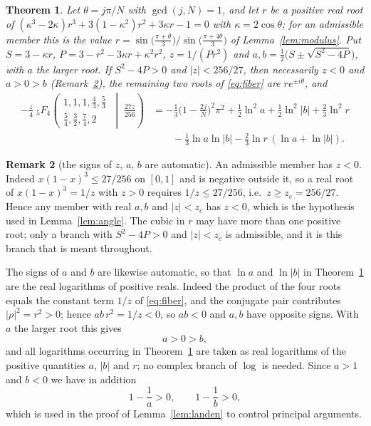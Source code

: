 \documentclass[11pt]{article}
\newtheorem{theorem}{Theorem}
\theoremstyle{definition}
\newtheorem{remark}[theorem]{Remark}
\begin{document}
\begin{theorem}\label{thm:main}
Let $\theta=j\pi/N$ with $\gcd(j,N)=1$, and let $r$ be a positive real root of
$(\kappa^3-2\kappa)r^3+3(1-\kappa^2)r^2+3\kappa r-1=0$ with $\kappa=2\cos\theta$; for an admissible
member this is the value $r=\sin\big(\tfrac{\pi+\theta}{3}\big)/\sin\big(\tfrac{\pi+4\theta}{3}\big)$
of Lemma~\textup{\ref{lem:modulus}}. Put
$S=3-\kappa r$, $P=3-r^2-3\kappa r+\kappa^2r^2$, $z=1/(Pr^2)$ and
$a,b=\tfrac12\big(S\pm\sqrt{S^2-4P}\big)$, with $a$ the larger root. If $S^2-4P>0$ and $|z|<256/27$,
then necessarily $z<0$ and $a>0>b$ (Remark~\textup{\ref{rem:signs}}), the remaining two roots of
\eqref{eq:fiber} are $re^{\pm i\theta}$, and
\begin{align*}
  -\frac{z}{4}\;{}_5F_4\!\left(\begin{matrix}1,1,1,\tfrac43,\tfrac53\\[2pt]
      \tfrac54,\tfrac32,\tfrac74,2\end{matrix}\;\middle|\;\frac{27z}{256}\right)
  &= -\frac13\Big(1-\frac{2j}{N}\Big)^2\pi^2
    + \tfrac12\ln^2 a+\tfrac12\ln^2|b|+\tfrac23\ln^2 r\\[2pt]
  &\qquad-\tfrac13\ln a\ln|b|-\tfrac23\ln r\,(\ln a+\ln|b|).
\end{align*}
\end{theorem}

\begin{remark}[the signs of $z$, $a$, $b$ are automatic]\label{rem:signs}
An admissible member has $z<0$. Indeed $x(1-x)^3\le 27/256$ on $[0,1]$ and is negative outside it, so
a real root of $x(1-x)^3=1/z$ with $z>0$ requires $1/z\le27/256$, i.e.\ $z\ge z_c=256/27$. Hence any
member with real $a,b$ and $|z|<z_c$ has $z<0$, which is the hypothesis used in Lemma~\ref{lem:angle}.
The cubic in $r$ may have more than one positive root; only a branch with $S^2-4P>0$ and $|z|<z_c$ is
admissible, and it is this branch that is meant throughout.

The signs of $a$ and $b$ are likewise automatic, so that $\ln a$ and $\ln|b|$ in
Theorem~\ref{thm:main} are the real logarithms of positive reals. Indeed the product of the four
roots equals the constant term $1/z$ of \eqref{eq:fiber}, and the conjugate pair contributes
$|\rho|^2=r^2>0$; hence $ab\,r^2=1/z<0$, so $ab<0$ and $a,b$ have opposite signs. With $a$ the larger
root this gives
\[
  a>0>b ,
\]
and all logarithms occurring in Theorem~\ref{thm:main} are taken as real logarithms of the positive
quantities $a$, $|b|$ and $r$; no complex branch of $\log$ is needed. Since $a>1$ and $b<0$ we have
in addition
\[
  1-\frac1a>0,\qquad 1-\frac1b>0,
\]
which is used in the proof of Lemma~\ref{lem:landen} to control principal arguments.
\end{remark}
\end{document}
